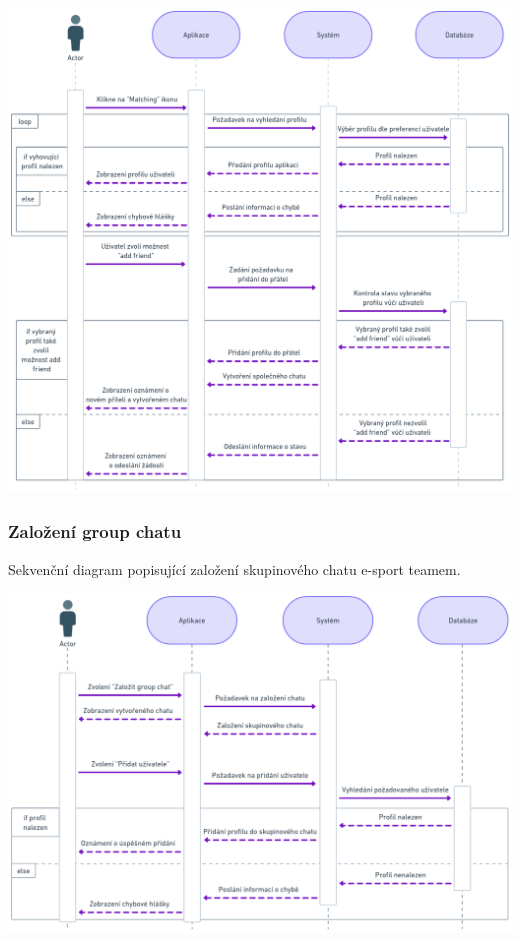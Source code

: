 \documentclass[czech,12pt,a4paper,titlepage]{article}
\begin{document}
\includegraphics[width=1\textwidth, center]{Sequence_diagram _2.png}

\clearpage

\subsubsection{Založení group chatu}

Sekvenční diagram popisující založení skupinového chatu e-sport teamem.

\bigskip
\bigskip
\bigskip
\bigskip
\bigskip
\bigskip


\includegraphics[width=1\textwidth, center]{Sequence_diagram _3.png}
\end{document}
